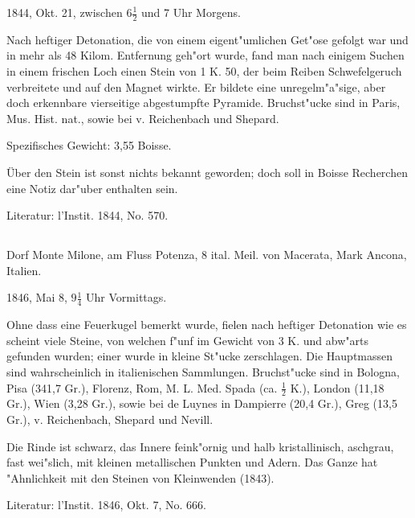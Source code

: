 \documentclass[a4paper, 11pt, oneside]{article}
\begin{document}
1844, Okt. 21, zwischen $\mathfrak{6\frac{1}{2}}$ und 7 Uhr Morgens.

Nach heftiger Detonation, die von einem eigent"umlichen Get"ose gefolgt war und in mehr als 48 Kilom. Entfernung geh"ort wurde, fand man nach einigem Suchen in einem frischen Loch einen Stein von 1 K. 50, der beim Reiben Schwefelgeruch verbreitete und auf den Magnet wirkte. Er bildete eine unregelm"a"sige, aber doch erkennbare vierseitige abgestumpfte Pyramide. Bruchst"ucke sind in Paris, Mus. Hist. nat., sowie bei v. Reichenbach und Shepard.

Spezifisches Gewicht: 3,55 Boisse.

Über den Stein ist sonst nichts bekannt geworden; doch soll in Boisse Recherchen eine Notiz dar"uber enthalten sein.

\normalsize
Literatur: l'Instit. 1844, No. 570.

\subsection{}
\LARGE
\paragraph{}
Dorf Monte Milone, am Fluss Potenza, 8 ital. Meil. von Macerata, Mark Ancona, Italien.

1846, Mai 8, $\mathfrak{9\frac{1}{4}}$ Uhr Vormittags.

Ohne dass eine Feuerkugel bemerkt wurde, fielen nach heftiger Detonation wie es scheint viele Steine, von welchen f"unf im Gewicht von 3 K. und abw"arts gefunden wurden; einer wurde in kleine St"ucke zerschlagen. Die Hauptmassen sind wahrscheinlich in italienischen Sammlungen. Bruchst"ucke sind in Bologna, Pisa (341,7 Gr.), Florenz, Rom, M. L. Med. Spada (ca. $\mathfrak{\frac{1}{2}}$ K.), London (11,18 Gr.), Wien (3,28 Gr.), sowie bei de Luynes in Dampierre (20,4 Gr.), Greg (13,5 Gr.), v. Reichenbach, Shepard und Nevill.

Die Rinde ist schwarz, das Innere feink"ornig und halb kristallinisch, aschgrau, fast wei"slich, mit kleinen metallischen Punkten und Adern. Das Ganze hat "Ahnlichkeit mit den Steinen von Kleinwenden (1843).

\normalsize
Literatur: l'Instit. 1846, Okt. 7, No. 666.

\subsection{}
\LARGE
\end{document}
